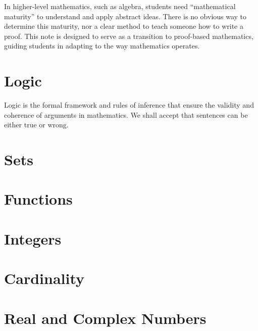 \documentclass[10pt]{article}
\begin{document}
\def\htitle{An Introduction to Proofs}
\def\hauthor{Hassium,}
\hsetup
\htoc
\hmain
\par
In higher-level mathematics, such as algebra, students need ``mathematical maturity'' to understand and apply abstract ideas. There is no obvious way to determine this maturity, nor a clear method to teach someone how to write a proof. This note is designed to serve as a transition to proof-based mathematics, guiding students in adapting to the way mathematics operates.
\section{Logic}
Logic is the formal framework and rules of inference that ensure the validity and coherence of arguments in mathematics. We shall accept that sentences can be either true or wrong. 






\newpage


\section{Sets}


\section{Functions}


\section{Integers}



\section{Cardinality}



\section{Real and Complex Numbers}

\hindex
\end{document}
